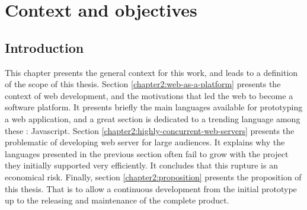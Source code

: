 \chapter{Context and objectives} \label{chapter2}
\minitoc
\eject

\section{Introduction}

This chapter presents the general context for this work, and leads to a definition of the scope of this thesis.
Section \ref{chapter2:web-as-a-platform} presents the context of web development, and the motivations that led the web to become a software platform.
It presents briefly the main languages available for prototyping a web application, and a great section is dedicated to a trending language among these : Javascript.
Section \ref{chapter2:highly-concurrent-web-servers} presents the problematic of developing web server for large audiences.
It explains why the languages presented in the previous section often fail to grow with the project they initially supported very efficiently.
It concludes that this rupture is an economical risk.
Finally, section \ref{chapter2:proposition} presents the proposition of this thesis.
That is to allow a continuous development from the initial prototype up to the releasing and maintenance of the complete product.



